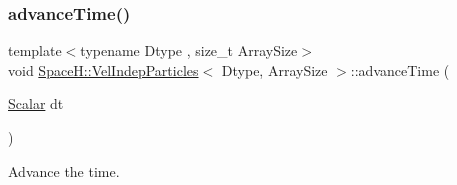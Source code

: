 \subsubsection{\texorpdfstring{advance\+Time()}{advanceTime()}}
{\footnotesize\ttfamily template$<$typename Dtype , size\+\_\+t Array\+Size$>$ \\
void \mbox{\hyperlink{class_space_h_1_1_vel_indep_particles}{Space\+H\+::\+Vel\+Indep\+Particles}}$<$ Dtype, Array\+Size $>$\+::advance\+Time (\begin{DoxyParamCaption}\item[{\mbox{\hyperlink{class_space_h_1_1_vel_indep_particles_aeb47d8131b30ed790320ff634f0d6af1}{Scalar}}}]{dt }\end{DoxyParamCaption})\hspace{0.3cm}{\ttfamily [inline]}}



Advance the time. 


